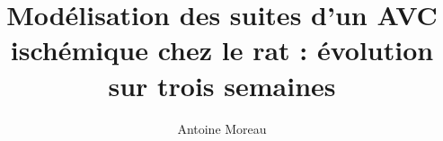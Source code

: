\documentclass[a4paper,10pt]{article}
\title{Mod\'elisation des suites d'un AVC isch\'emique chez le rat : \'evolution sur trois semaines}
\author{Antoine Moreau}
\begin{document}
\maketitle

\begin{abstract}

\end{abstract}








%



\newpage


\end{document}
